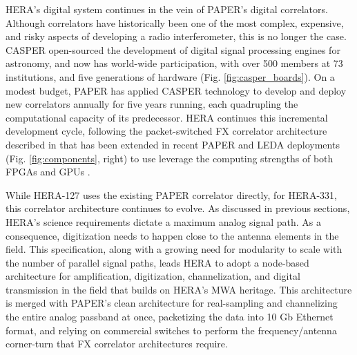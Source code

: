 \documentclass[preprint]{aastex}
\begin{document}
HERA's digital system continues in the vein of PAPER's digital correlators.
Although correlators have historically been one of the most complex,
expensive, and risky aspects of developing a radio interferometer, this is no longer the case.
CASPER \citep{parsons_et_al2006}
open-sourced the development of digital signal processing engines for astronomy, and
now has world-wide participation,
with over 500 members at 73 institutions, and 
five generations of hardware (Fig. \ref{fig:casper_boards}). 
On a modest budget, PAPER has applied CASPER technology to develop and deploy new correlators
annually for five years running, each quadrupling the computational capacity of its predecessor.
HERA continues this incremental development cycle, following the packet-switched
FX correlator architecture described in \citet{parsons_et_al2008} that has been
extended in recent PAPER and LEDA deployments (Fig. \ref{fig:components}, right)
to use leverage the computing strengths of both FPGAs and GPUs \citep{clark_et_al2011}.

While HERA-127 uses the existing PAPER correlator directly, for
HERA-331, this correlator architecture continues to evolve.  As discussed in previous sections,
HERA's science requirements dictate a maximum analog signal path.  As a consequence,
digitization needs to happen close to the antenna
elements in the field.  This specification, along with a growing need for modularity to scale with the number of parallel signal paths,
leads HERA to adopt a node-based architecture for amplification, digitization, channelization, and digital
transmission in the field that builds on HERA's MWA heritage.  This architecture is merged with PAPER's clean 
architecture for real-sampling and channelizing the entire analog passband at once, packetizing the data into
10 Gb Ethernet format, and relying on commercial switches to perform the frequency/antenna corner-turn that
FX correlator architectures require. 

\end{document}
